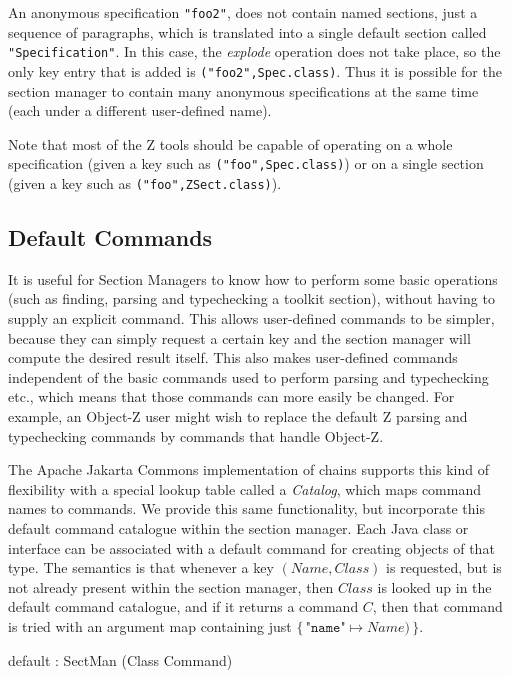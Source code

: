 \documentclass{llncs} %
\begin{document}
An anonymous specification \texttt{"foo2"}, does not contain named
sections, just a sequence of paragraphs, which is translated into
a single default section called \texttt{"Specification"}.
In this case, the \emph{explode} operation does not take place,
so the only key entry that is added is \texttt{("foo2",Spec.class)}.  
Thus it is possible for the section manager to contain many
anonymous specifications at the same time (each under a different
user-defined name).

Note that most of the Z tools should be capable of operating
on a whole specification (given a key such as \texttt{("foo",Spec.class)})
or on a single section (given a key such as \texttt{("foo",ZSect.class)}).


\subsection{Default Commands}

It is useful for Section Managers to know how to perform some basic 
operations (such as finding, parsing and typechecking a toolkit section),
without having to supply an explicit command.  This allows user-defined
commands to be simpler, because they can simply request a certain key and
the section manager will compute the desired result itself.  This also
makes user-defined commands independent of the basic commands used to
perform parsing and typechecking etc., which means that those commands
can more easily be changed.  For example, an Object-Z user might wish
to replace the default Z parsing and typechecking commands by commands
that handle Object-Z.  

The Apache Jakarta Commons implementation of chains supports this
kind of flexibility with a special lookup table called a \emph{Catalog},
which maps command names to commands.  We provide this same
functionality, but incorporate this default command catalogue within 
the section manager.  Each Java class or interface can be associated
with a default command for creating objects of that type.
The semantics is that whenever a key $(Name,Class)$
is requested, but is not already present within the section manager, then
$Class$ is looked up in the default command catalogue, and if it returns
a command $C$, then that command is tried with an argument map containing
just $\{\, \texttt{"name"} \mapsto Name)\, \}$.

\begin{zed}
  default : SectMan \fun (Class \ffun Command)
\end{zed}
\end{document}
